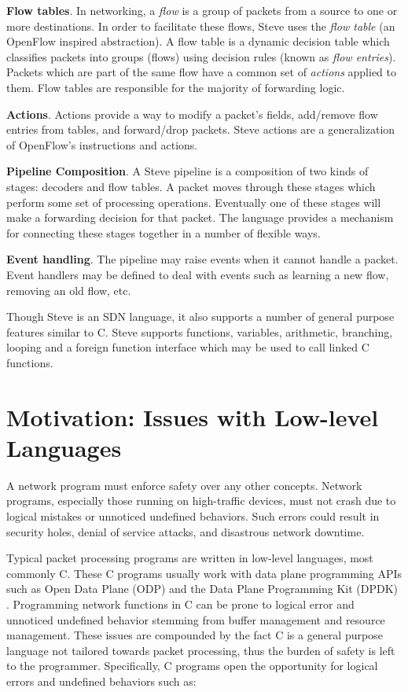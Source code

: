 \textbf{Flow tables}. 
In networking, a \emph{flow} is a group of packets from a source to one or more 
destinations. In order to facilitate these flows, Steve uses the
\emph{flow table} (an OpenFlow inspired abstraction). 
A flow table is a dynamic
decision table which classifies packets into groups (flows) using
decision rules (known as \emph{flow entries}).
Packets which are part of the same flow have a common set of \emph{actions}
applied to them.
Flow tables are responsible for the majority of forwarding logic.

\textbf{Actions}. Actions provide a way to modify a packet's fields, add/remove
flow entries from tables, and forward/drop packets. Steve actions are a generalization
of OpenFlow's instructions and actions.

\textbf{Pipeline Composition}. A Steve pipeline is a composition of two kinds of stages:
decoders and flow tables.
A packet moves through these stages which perform some set of processing operations.
Eventually one of these stages will make a forwarding decision for that packet.
The language provides a mechanism for connecting these
stages together in a number of flexible ways.

\textbf{Event handling}. The pipeline may raise events when it cannot handle a
packet. Event handlers may be defined to deal with events such as learning a new
flow, removing an old flow, etc.

Though Steve is an SDN language, it also supports a number of general purpose
features similar to C. Steve supports functions, variables, arithmetic, branching, looping
and a foreign function interface which may be used to call linked C functions.

\section{Motivation: Issues with Low-level Languages}

A network program must enforce safety over any other concepts.
Network programs, especially those running on high-traffic devices, must not
crash due to logical mistakes or unnoticed undefined behaviors.
Such errors could result in security holes, denial of service attacks, and
disastrous network downtime.

Typical packet processing programs are written in low-level languages, most
commonly C. These C programs usually work with data plane programming APIs such
as Open Data Plane (ODP) \cite{odp_webpage} and the Data Plane Programming Kit
(DPDK) \cite{dpdk_webpage}. Programming network functions in C can be prone
to logical error and unnoticed undefined behavior stemming from buffer management
and resource management. These issues are compounded by the fact C is a general
purpose language not tailored towards packet processing, thus the burden of safety
is left to the programmer.
Specifically, C programs open the opportunity for logical errors and undefined
behaviors such as:

